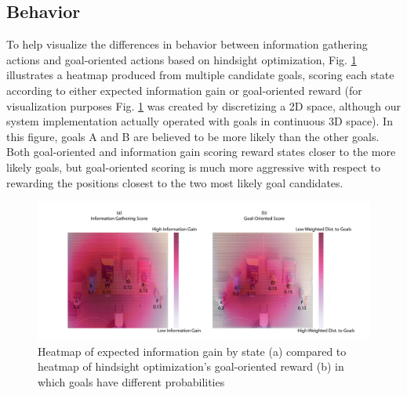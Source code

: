 \documentclass[conference]{IEEEtran}
\begin{document}
\subsection{Behavior}

To help visualize the differences in behavior between information gathering actions and goal-oriented actions based on hindsight optimization, %
Fig. \ref{heatmap2} illustrates a heatmap produced from multiple candidate goals, scoring each state according to either expected information gain or goal-oriented reward (for visualization purposes Fig. \ref{heatmap2} was created by discretizing a 2D space, although our system implementation actually operated with goals in continuous 3D space). In this figure, goals A and B are believed to be more likely than the other goals. Both goal-oriented and information gain scoring reward states closer to the more likely goals, but goal-oriented scoring is much more aggressive with respect to rewarding the positions closest to the two most likely goal candidates.



\begin{figure}
\includegraphics[width=\columnwidth]{figures/Heatmap_Uneven_Belief.pdf}
\caption{Heatmap of expected information gain by state (a) compared to heatmap of hindsight optimization's goal-oriented reward (b) in which goals have different probabilities}
\label{heatmap2}
\end{figure}
\end{document}
